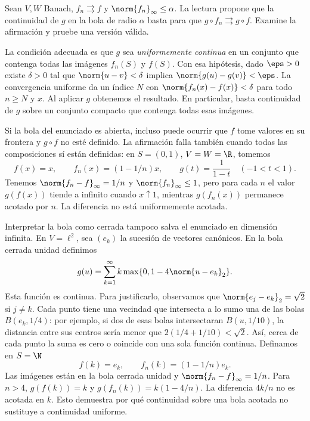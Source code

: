 \begin{ejercicio}\label{ej:lectura-26-3}
Sean $V,W$ Banach, $f_n\rightrightarrows f$ y $\norm{f_n}_\infty\le\alpha$. La lectura propone que la continuidad de $g$ en la bola de radio $\alpha$ basta para que $g\circ f_n\rightrightarrows g\circ f$. Examine la afirmación y pruebe una versión válida.
\end{ejercicio}
\begin{solucion}
La condición adecuada es que $g$ sea \emph{uniformemente continua} en un conjunto que contenga todas las imágenes $f_n(S)$ y $f(S)$. Con esa hipótesis, dado $\eps>0$ existe $\delta>0$ tal que
$\norm{u-v}<\delta$ implica $\norm{g(u)-g(v)}<\eps$. La convergencia uniforme da un índice $N$ con $\norm{f_n(x)-f(x)}<\delta$ para todo $n\ge N$ y $x$. Al aplicar $g$ obtenemos el resultado. En particular, basta continuidad de $g$ sobre un conjunto compacto que contenga todas esas imágenes.

Si la bola del enunciado es abierta, incluso puede ocurrir que $f$ tome valores en su frontera y $g\circ f$ no esté definido. La afirmación falla también cuando todas las composiciones sí están definidas: en $S=(0,1)$, $V=W=\R$, tomemos
\[
 f(x)=x,\qquad f_n(x)=(1-1/n)x,\qquad g(t)=\frac1{1-t}\quad(-1<t<1).
\]
Tenemos $\norm{f_n-f}_\infty=1/n$ y $\norm{f_n}_\infty\le1$, pero para cada $n$ el valor $g(f(x))$ tiende a infinito cuando $x\uparrow1$, mientras $g(f_n(x))$ permanece acotado por $n$. La diferencia no está uniformemente acotada.

Interpretar la bola como cerrada tampoco salva el enunciado en dimensión infinita. En $V=\ell^2$, sea $(e_k)$ la sucesión de vectores canónicos. En la bola cerrada unidad definimos
\[
 g(u)=\sum_{k=1}^\infty k\max\{0,1-4\norm{u-e_k}_2\}.
\]
Esta función es continua. Para justificarlo, observamos que $\norm{e_j-e_k}_2=\sqrt2$ si $j\ne k$. Cada punto tiene una vecindad que intersecta a lo sumo una de las bolas $B(e_k,1/4)$: por ejemplo, si dos de esas bolas intersectaran $B(u,1/10)$, la distancia entre sus centros sería menor que $2(1/4+1/10)<\sqrt2$. Así, cerca de cada punto la suma es cero o coincide con una sola función continua. Definamos en $S=\N$
\[
 f(k)=e_k,\qquad f_n(k)=(1-1/n)e_k.
\]
Las imágenes están en la bola cerrada unidad y $\norm{f_n-f}_\infty=1/n$. Para $n>4$, $g(f(k))=k$ y $g(f_n(k))=k(1-4/n)$. La diferencia $4k/n$ no es acotada en $k$. Esto demuestra por qué continuidad sobre una bola acotada no sustituye a continuidad uniforme.
\end{solucion}

